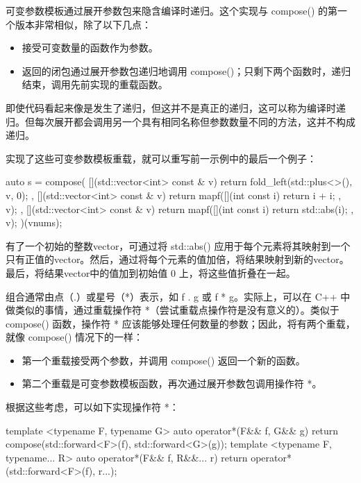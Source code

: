 可变参数模板通过展开参数包来隐含编译时递归。这个实现与 compose() 的第一个版本非常相似，除了以下几点：

\begin{itemize}
\item
接受可变数量的函数作为参数。

\item
返回的闭包通过展开参数包递归地调用 compose()；只剩下两个函数时，递归结束，调用先前实现的重载函数。
\end{itemize}

即使代码看起来像是发生了递归，但这并不是真正的递归，这可以称为编译时递归。但每次展开都会调用另一个具有相同名称但参数数量不同的方法，这并不构成递归。

实现了这些可变参数模板重载，就可以重写前一示例中的最后一个例子：

\begin{cpp}
auto s = compose(
    [](std::vector<int> const & v) {
        return fold_left(std::plus<>(), v, 0); },
    [](std::vector<int> const & v) {
        return mapf([](int const i) {return i + i; }, v); },
    [](std::vector<int> const & v) {
        return mapf([](int const i) {return std::abs(i); }, v); })(vnums);
\end{cpp}

有了一个初始的整数vector，可通过将 std::abs() 应用于每个元素将其映射到一个只有正值的vector。然后，通过将每个元素的值加倍，将结果映射到新的vector。最后，将结果vector中的值加到初始值 0 上，将这些值折叠在一起。


组合通常由点（.）或星号（*）表示，如 f . g 或 f * g。实际上，可以在 C++ 中做类似的事情，通过重载操作符 *（尝试重载点操作符是没有意义的）。类似于 compose() 函数，操作符 * 应该能够处理任何数量的参数；因此，将有两个重载，就像 compose() 情况下的一样：

\begin{itemize}
\item
第一个重载接受两个参数，并调用 compose() 返回一个新的函数。

\item
第二个重载是可变参数模板函数，再次通过展开参数包调用操作符 *。
\end{itemize}

根据这些考虑，可以如下实现操作符 *：

\begin{cpp}
template <typename F, typename G>
auto operator*(F&& f, G&& g)
{
    return compose(std::forward<F>(f), std::forward<G>(g));
}
template <typename F, typename... R>
auto operator*(F&& f, R&&... r)
{
    return operator*(std::forward<F>(f), r...);
}
\end{cpp}

